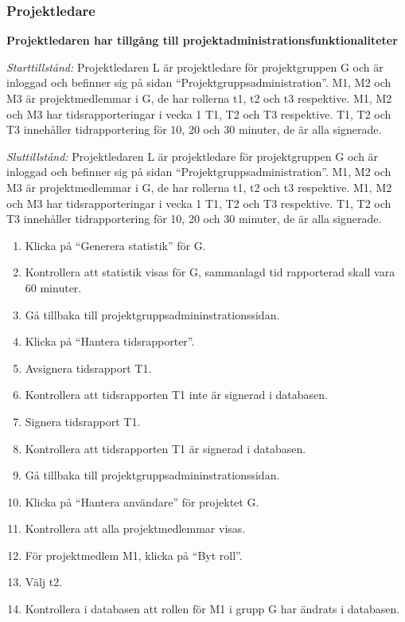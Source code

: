 \documentclass[a4paper]{article}
\begin{document}
\begin{ST}
\begin{enumerate}
\end{enumerate}

\end{ST}

\subsubsection{Projektledare}
\begin{ST}
\item \textbf{Projektledaren har tillgång till projektadministrationsfunktionaliteter}

\emph{Starttillstånd:} Projektledaren L är projektledare för projektgruppen G och är inloggad och befinner sig på sidan ``Projektgruppsadministration''. M1, M2 och M3 är projektmedlemmar i G, de har rollerna t1, t2 och t3 respektive. M1, M2 och M3 har tidsrapporteringar i vecka 1 T1, T2 och T3 respektive. T1, T2 och T3 innehåller tidrapportering för 10, 20 och 30 minuter, de är alla signerade.

\emph{Sluttillstånd:} Projektledaren L är projektledare för projektgruppen G och är inloggad och befinner sig på sidan ``Projektgruppsadministration''. M1, M2 och M3 är projektmedlemmar i G, de har rollerna t1, t2 och t3 respektive. M1, M2 och M3 har tidsrapporteringar i vecka 1 T1, T2 och T3 respektive. T1, T2 och T3 innehåller tidrapportering för 10, 20 och 30 minuter, de är alla signerade.

\begin{enumerate}
\item Klicka på ``Generera statistik'' för G.
\item Kontrollera att statistik visas för G, sammanlagd tid rapporterad skall vara 60 minuter.
\item Gå tillbaka till projektgruppsadmininstrationssidan.
\item Klicka på ``Hantera tidsrapporter''.
\item Avsignera tidsrapport T1.
\item Kontrollera att tidsrapporten T1 inte är signerad i databasen.
\item Signera tidsrapport T1.
\item Kontrollera att tidsrapporten T1 är signerad i databasen.
\item Gå tillbaka till projektgruppsadmininstrationssidan.
\item Klicka på ``Hantera användare'' för projektet G.
\item Kontrollera att alla projektmedlemmar visas.
\item För projektmedlem M1, klicka på ``Byt roll''.
\item Välj t2.
\item Kontrollera i databasen att rollen för M1 i grupp G har ändrats i databasen.
\end{enumerate}
\end{ST}
\end{document}
